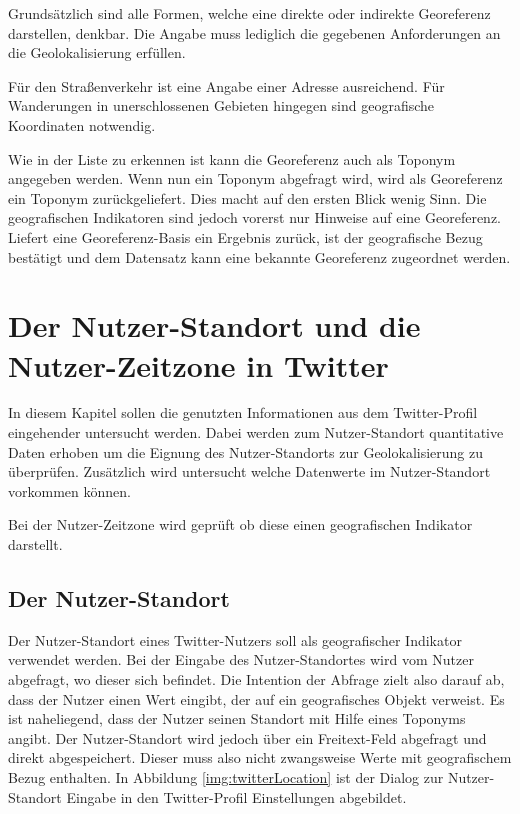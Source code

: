 	 	Grundsätzlich sind alle Formen, welche eine direkte oder indirekte Georeferenz darstellen, denkbar.
	 	Die Angabe muss lediglich die gegebenen Anforderungen an die Geolokalisierung erfüllen.

	  	Für den Straßenverkehr ist eine Angabe einer Adresse ausreichend.
		Für Wanderungen in unerschlossenen Gebieten hingegen sind geografische Koordinaten notwendig. 

		Wie in der Liste zu erkennen ist kann die Georeferenz auch als Toponym angegeben werden.
		Wenn nun ein Toponym abgefragt wird, wird als Georeferenz ein Toponym zurückgeliefert.
		Dies macht auf den ersten Blick wenig Sinn.
		Die geografischen Indikatoren sind jedoch vorerst nur Hinweise auf eine Georeferenz.
		Liefert eine Georeferenz-Basis ein Ergebnis zurück, ist der geografische Bezug bestätigt und dem Datensatz kann eine bekannte Georeferenz zugeordnet werden.				
	
	\section{Der Nutzer-Standort und die Nutzer-Zeitzone in Twitter}

		In diesem Kapitel sollen die genutzten Informationen aus dem Twitter-Profil eingehender untersucht werden.
		Dabei werden zum Nutzer-Standort quantitative Daten erhoben um die Eignung des Nutzer-Standorts zur Geolokalisierung zu überprüfen.
		Zusätzlich wird untersucht welche Datenwerte im Nutzer-Standort vorkommen können.

		Bei der Nutzer-Zeitzone wird geprüft ob diese einen geografischen Indikator darstellt. 

		\subsection{Der Nutzer-Standort} \label{subsec:nutzerStandort} 

			Der Nutzer-Standort eines Twitter-Nutzers soll als geografischer Indikator verwendet werden.
			Bei der Eingabe des Nutzer-Standortes wird vom Nutzer abgefragt, wo dieser sich befindet. 
			Die Intention der Abfrage zielt also darauf ab, dass der Nutzer einen Wert eingibt, der auf ein geografisches Objekt verweist. 
			Es ist naheliegend, dass der Nutzer seinen Standort mit Hilfe eines Toponyms angibt.
			Der Nutzer-Standort wird jedoch über ein Freitext-Feld abgefragt und direkt abgespeichert.
			Dieser muss also nicht zwangsweise Werte mit geografischem Bezug enthalten. 
			In Abbildung \ref{img:twitterLocation} ist der Dialog zur Nutzer-Standort Eingabe in den Twitter-Profil Einstellungen abgebildet.


